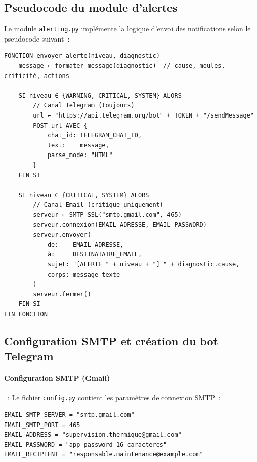 \subsection{Pseudocode du module d'alertes}

Le module \texttt{alerting.py} implémente la logique d'envoi des notifications selon le pseudocode suivant~:

\begin{center}
\begin{minipage}{0.90\textwidth}
\begin{verbatim}
FONCTION envoyer_alerte(niveau, diagnostic)
    message ← formater_message(diagnostic)  // cause, moules, criticité, actions
    
    SI niveau ∈ {WARNING, CRITICAL, SYSTEM} ALORS
        // Canal Telegram (toujours)
        url ← "https://api.telegram.org/bot" + TOKEN + "/sendMessage"
        POST url AVEC {
            chat_id: TELEGRAM_CHAT_ID,
            text:    message,
            parse_mode: "HTML"
        }
    FIN SI
    
    SI niveau ∈ {CRITICAL, SYSTEM} ALORS
        // Canal Email (critique uniquement)
        serveur ← SMTP_SSL("smtp.gmail.com", 465)
        serveur.connexion(EMAIL_ADRESSE, EMAIL_PASSWORD)
        serveur.envoyer(
            de:    EMAIL_ADRESSE,
            à:     DESTINATAIRE_EMAIL,
            sujet: "[ALERTE " + niveau + "] " + diagnostic.cause,
            corps: message_texte
        )
        serveur.fermer()
    FIN SI
FIN FONCTION
\end{verbatim}
\end{minipage}
\end{center}

\subsection{Configuration SMTP et création du bot Telegram}

\paragraph{Configuration SMTP (Gmail)}~: Le fichier \texttt{config.py} contient les paramètres de connexion SMTP~:

\begin{center}
\begin{minipage}{0.70\textwidth}
\begin{verbatim}
EMAIL_SMTP_SERVER = "smtp.gmail.com"
EMAIL_SMTP_PORT = 465
EMAIL_ADDRESS = "supervision.thermique@gmail.com"
EMAIL_PASSWORD = "app_password_16_caracteres"
EMAIL_RECIPIENT = "responsable.maintenance@example.com"
\end{verbatim}
\end{minipage}
\end{center}

